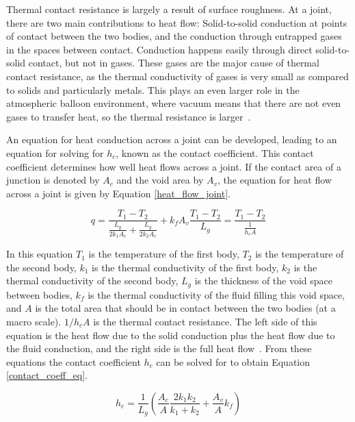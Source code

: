 Thermal contact resistance is largely a result of surface roughness. At a joint, there are two main contributions to heat flow: Solid-to-solid conduction at points of contact between the two bodies, and the conduction through entrapped gases in the spaces between contact. Conduction happens easily through direct solid-to-solid contact, but not in gases. These gases are the major cause of thermal contact resistance, as the thermal conductivity of gases is very small as compared to solids and particularly metals. This plays an even larger role in the atmospheric balloon environment, where vacuum means that there are not even gases to transfer heat, so the thermal resistance is larger~\citep{Heat_Transfer_Resistance}. 

An equation for heat conduction across a joint can be developed, leading to an equation for solving for $h_c$, known as the contact coefficient. This contact coefficient determines how well heat flows across a joint. If the contact area of a junction is denoted by $A_c$ and the void area by $A_v$, the equation for heat flow across a joint is given by Equation \ref{heat_flow_joint}. %

\begin{equation}\label{heat_flow_joint}
    q = \frac{T_1 - T_2}{\frac{L_g}{2k_1A_c}+\frac{L_g}{2k_2A_c}}+k_fA_v\frac{T_1-T_2}{L_g} = \frac{T_1-T_2}{\frac{1}{h_cA}}
\end{equation}

In this equation $T_1$ is the temperature of the first body, $T_2$ is the temperature of the second body, $k_1$ is the thermal conductivity of the first body, $k_2$ is the thermal conductivity of the second body, $L_g$ is the thickness of the void space between bodies, $k_f$ is the thermal conductivity of the fluid filling this void space, and $A$ is the total area that should be in contact between the two bodies (at a macro scale). $1/h_cA$ is the thermal contact resistance. The left side of this equation is the heat flow due to the solid conduction plus the heat flow due to the fluid conduction, and the right side is the full heat flow~\citep{Heat_Transfer_Resistance}. From these equations the contact coefficient $h_c$ can be solved for to obtain Equation \ref{contact_coeff_eq}.

\begin{equation}\label{contact_coeff_eq}
    h_c = \frac{1}{L_g}\left( \frac{A_c}{A}\frac{2k_1k_2}{k_1+k_2}+\frac{A_v}{A}k_f \right)
\end{equation}

